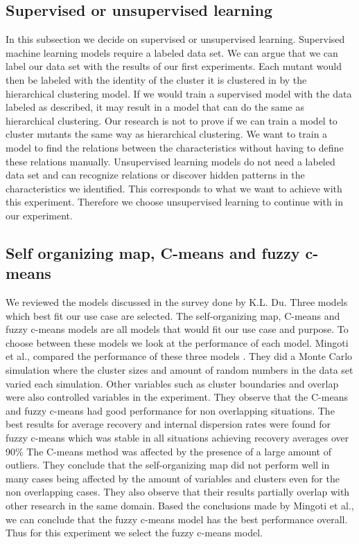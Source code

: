 \documentclass[conference,draftclsnofoot,onecolumn]{IEEEtran}
\begin{document}
\subsection{Supervised or unsupervised learning}
In this subsection we decide on supervised or unsupervised learning.
\newline
Supervised machine learning models require a labeled data set.
We can argue that we can label our data set with the results of our first experiments.
Each mutant would then be labeled with the identity of the cluster it is clustered in by the hierarchical clustering model.
If we would train a supervised model with the data labeled as described, it may result in a model that can do the same as hierarchical clustering.
Our research is not to prove if we can train a model to cluster mutants the same way as hierarchical clustering.
We want to train a model to find the relations between the characteristics without having to define these relations manually.
\newline
Unsupervised learning models do not need a labeled data set and can recognize relations or discover hidden patterns in the characteristics we identified.
This corresponds to what we want to achieve with this experiment.
Therefore we choose unsupervised learning to continue with in our experiment.

\subsection{Self organizing map, C-means and fuzzy c-means}
\label{ch:topThreeModels}
We reviewed the models discussed in the survey done by K.L. Du\cite{Du2010Clustering:Approach, thesis}. 
Three models which best fit our use case are selected.
The self-organizing map, C-means and fuzzy c-means models are all models that would fit our use case and purpose. 
To choose between these models we look at the performance of each model.
Mingoti et al., compared the performance of these three models \cite{Mingoti2006ComparingAlgorithms}.
They did a Monte Carlo simulation where the cluster sizes and amount of random numbers in the data set varied each simulation\cite{Mingoti2006ComparingAlgorithms}.
Other variables such as cluster boundaries and overlap were also controlled variables in the experiment.
They observe that the C-means and fuzzy c-means had good performance for non overlapping situations\cite{Mingoti2006ComparingAlgorithms}.
The best results for average recovery and internal dispersion rates were found for fuzzy c-means which was stable in all situations achieving recovery averages over 90\%\cite{Mingoti2006ComparingAlgorithms}
The C-means method was affected by the presence of a large amount of outliers.
They conclude that the self-organizing map did not perform well in many cases being affected by the amount of variables and clusters even for the non overlapping cases\cite{Mingoti2006ComparingAlgorithms}.
They also observe  that their results partially overlap with other research in the same domain.
\newline
Based the conclusions made by Mingoti et al., we can conclude that the fuzzy c-means model has the best performance overall.
Thus for this experiment we select the fuzzy c-means model.
\end{document}
